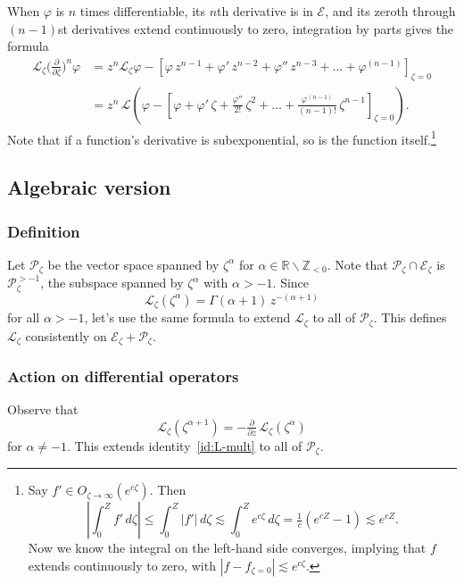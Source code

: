 \documentclass{article}
\theoremstyle{plain}
\newcommand{\Z}{\mathbb{Z}}
\newcommand{\R}{\mathbb{R}}
\newcommand{\laplace}{\mathcal{L}}
\begin{document}
\color{violet}
When $\varphi$ is $n$ times differentiable, its $n$th derivative is in $\mathcal{E}$, and its zeroth through $(n - 1)$st derivatives extend continuously to zero, integration by parts gives the formula
\begin{align}\label{id:L-diff}
\laplace_\zeta \big(\tfrac{\partial}{\partial \zeta}\big)^n \varphi & = z^n \laplace_\zeta \varphi - \left[ \varphi\,z^{n-1} + \varphi'\,z^{n-2} + \varphi''\,z^{n-3} + \ldots + \varphi^{(n-1)} \right]_{\zeta = 0} \\
& = z^n\,\laplace\left( \varphi - \left[ \varphi + \varphi'\,\zeta + \tfrac{\varphi''}{2!}\,\zeta^2 + \ldots + \tfrac{\varphi^{(n-1)}}{(n-1)!}\,\zeta^{n-1} \right]_{\zeta = 0} \right). \nonumber
\end{align}
Note that if a function's derivative is subexponential, so is the function itself.\footnote{Say $f' \in O_{\zeta \to \infty}(e^{c\zeta})$. Then \[ \left|\int_0^Z f'\,d\zeta\right| \le \int_0^Z |f'|\,d\zeta \lesssim \int_0^Z e^{c\zeta}\,d\zeta = \tfrac{1}{c}(e^{cZ} - 1) \lesssim e^{cZ}.\] Now we know the integral on the left-hand side converges, implying that $f$ extends continuously to zero, with $|f - f_{\zeta = 0}| \lesssim e^{c\zeta}$.}
\subsection{Algebraic version}
\subsubsection{Definition}
Let $\mathcal{P}_\zeta$ be the vector space spanned by $\zeta^\alpha$ for $\alpha \in \R \smallsetminus \Z_{< 0}$. Note that $\mathcal{P}_\zeta \cap \mathcal{E}_\zeta$ is $\mathcal{P}_\zeta^{> -1}$, the subspace spanned by $\zeta^\alpha$ with $\alpha > -1$. Since
\[ \laplace_\zeta(\zeta^\alpha) = \Gamma(\alpha+1)\,z^{-(\alpha + 1)} \]
for all $\alpha > -1$, let's use the same formula to extend $\laplace_\zeta$ to all of $\mathcal{P}_\zeta$. This defines $\laplace_\zeta$ consistently on $\mathcal{E}_\zeta + \mathcal{P}_\zeta$.
\subsubsection{Action on differential operators}\label{L-diff-op-alg}
Observe that
\[ \laplace_\zeta(\zeta^{\alpha + 1}) = -\tfrac{\partial}{\partial z}\,\laplace_\zeta(\zeta^\alpha) \]
for $\alpha \neq -1$. This extends identity~\ref{id:L-mult} to all of $\mathcal{P}_\zeta$.
\end{document}
